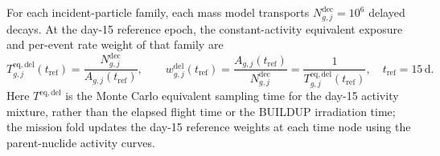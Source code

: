\documentclass[11pt]{article}
\begin{document}
\begingroup

For each incident-particle family, each mass model
transports $N^{\mathrm{dec}}_{g,j}=10^6$ delayed decays. At the day-15 reference
epoch, the constant-activity equivalent exposure and per-event rate weight of
that family are
\begin{equation}
 T^{\mathrm{eq,del}}_{g,j}(t_{\mathrm{ref}})
 =\frac{N^{\mathrm{dec}}_{g,j}}{A_{g,j}(t_{\mathrm{ref}})},
 \qquad
 w^{\mathrm{del}}_{g,j}(t_{\mathrm{ref}})
 =\frac{A_{g,j}(t_{\mathrm{ref}})}{N^{\mathrm{dec}}_{g,j}}
 =\frac{1}{T^{\mathrm{eq,del}}_{g,j}(t_{\mathrm{ref}})},
 \quad t_{\mathrm{ref}}=15\,\mathrm{d}.
 \label{eq:delayed_equivalent_exposure}
\end{equation}
Here $T^{\mathrm{eq,del}}$ is the Monte Carlo equivalent sampling time for the
day-15 activity mixture, rather than the elapsed flight time or the BUILDUP
irradiation time; the mission fold updates the day-15 reference weights at each
time node using the parent-nuclide activity curves.
\endgroup

\begingroup
\end{document}
